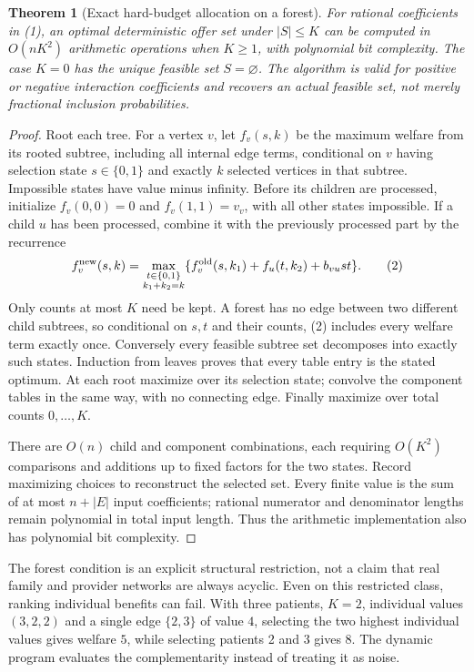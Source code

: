 \documentclass[11pt]{article}
\newtheorem{theorem}{Theorem}
\theoremstyle{remark}\newtheorem{remark}[theorem]{Remark}
\begin{document}
\begin{theorem}[Exact hard-budget allocation on a forest]
For rational coefficients in (1), an optimal deterministic offer set under $|S|\le K$ can be computed in $O(nK^2)$ arithmetic operations when $K\ge1$, with polynomial bit complexity. The case $K=0$ has the unique feasible set $S=\varnothing$. The algorithm is valid for positive or negative interaction coefficients and recovers an actual feasible set, not merely fractional inclusion probabilities.
\end{theorem}
\begin{proof}
Root each tree. For a vertex $v$, let $f_v(s,k)$ be the maximum welfare from its rooted subtree, including all internal edge terms, conditional on $v$ having selection state $s\in\{0,1\}$ and exactly $k$ selected vertices in that subtree. Impossible states have value minus infinity. Before its children are processed, initialize $f_v(0,0)=0$ and $f_v(1,1)=v_v$, with all other states impossible. If a child $u$ has been processed, combine it with the previously processed part by the recurrence
\[
 f_v^{\rm new}(s,k)=
 \max_{\substack{t\in\{0,1\}\\k_1+k_2=k}}
 \{f_v^{\rm old}(s,k_1)+f_u(t,k_2)+b_{vu}st\}.
 \tag{2}
\]
Only counts at most $K$ need be kept. A forest has no edge between two different child subtrees, so conditional on $s,t$ and their counts, (2) includes every welfare term exactly once. Conversely every feasible subtree set decomposes into exactly such states. Induction from leaves proves that every table entry is the stated optimum. At each root maximize over its selection state; convolve the component tables in the same way, with no connecting edge. Finally maximize over total counts $0,\ldots,K$.

There are $O(n)$ child and component combinations, each requiring $O(K^2)$ comparisons and additions up to fixed factors for the two states. Record maximizing choices to reconstruct the selected set. Every finite value is the sum of at most $n+|E|$ input coefficients; rational numerator and denominator lengths remain polynomial in total input length. Thus the arithmetic implementation also has polynomial bit complexity.
\end{proof}

The forest condition is an explicit structural restriction, not a claim that real family and provider networks are always acyclic. Even on this restricted class, ranking individual benefits can fail. With three patients, $K=2$, individual values $(3,2,2)$ and a single edge $\{2,3\}$ of value $4$, selecting the two highest individual values gives welfare $5$, while selecting patients 2 and 3 gives $8$. The dynamic program evaluates the complementarity instead of treating it as noise.
\end{document}
